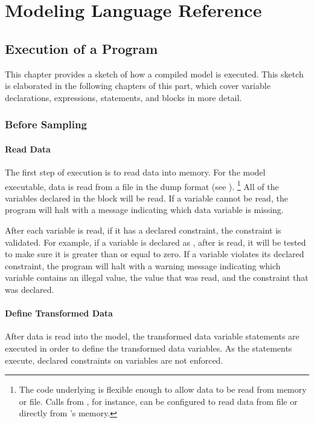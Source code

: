 \part{Modeling Language Reference}

\chapter{Execution of a \Stan Program}

\noindent 
This chapter provides a sketch of how a compiled \Stan model is
executed.  This sketch is elaborated in the following chapters of this
part, which cover variable declarations, expressions, statements, and
blocks in more detail.

\section{Before Sampling}

\subsection{Read Data}

The first step of execution is to read data into memory.  
For the \Stan model executable, data is read from a file in the dump
format (see ).%
%
\footnote{The \Cpp code underlying \Stan is flexible enough to allow
  data to be read from memory or file.  Calls from \R, for instance,
  can be configured to read data from file or directly from \R's
  memory.}
All of the variables declared in the  block will be read.
If a variable cannot be read, the program will halt with a message
indicating which data variable is missing.

After each variable is read, if it has a declared constraint, the
constraint is validated.  For example, if a variable  is
declared as , after  is read, it will be tested
to make sure it is greater than or equal to zero.  If a variable
violates its declared constraint, the program will halt with a warning
message indicating which variable contains an illegal value, the value
that was read, and the constraint that was declared.

\subsection{Define Transformed Data}

After data is read into the model, the transformed data variable
statements are executed in order to define the transformed data
variables.  As the statements execute, declared constraints on
variables are not enforced.

